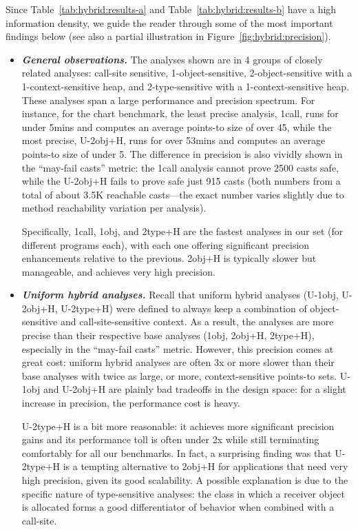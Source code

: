 \begin{table}
\label{tab:hybrid:results-b}
\end{table}

Since Table~\ref{tab:hybrid:results-a} and Table~\ref{tab:hybrid:results-b} have a high information density, we guide the reader through some of the most important findings below (see also a partial illustration in Figure~\ref{fig:hybrid:precision}).

\begin{itemize}
\item \textbf{\emph{General observations.}}
The analyses shown are in 4 groups of closely related analyses: call-site sensitive, 1-object-sensitive, 2-object-sensitive with a 1-context-sensitive heap, and 2-type-sensitive with a 1-context-sensitive heap. These analyses span a large performance and precision spectrum. For instance, for the chart benchmark, the least precise analysis, 1call, runs for under 5mins and computes an average points-to size of over 45, while the most precise, U-2obj+H, runs for over 53mins and computes an average points-to size of under 5. The difference in precision is also vividly shown in the ``may-fail casts'' metric: the 1call analysis cannot prove 2500 casts safe, while the U-2obj+H fails to prove safe just 915 casts (both numbers from a total of about 3.5K reachable casts---the exact number varies slightly due to method reachability variation per analysis). 

Specifically, 1call, 1obj, and 2type+H are the fastest analyses in our set (for different programs each), with each one offering significant precision enhancements relative to the previous. 2obj+H is typically slower but manageable, and achieves very high precision.

\item \textbf{\emph{Uniform hybrid analyses.}}
Recall that uniform hybrid analyses (U-1obj, U-2obj+H, U-2type+H) were defined to always keep a combination of object-sensitive and call-site-sensitive context. As a result, the analyses are more precise than their respective base analyses (1obj, 2obj+H, 2type+H), especially in the ``may-fail casts'' metric. However, this precision comes at great cost: uniform hybrid analyses are often 3x or more slower than their base analyses with twice as large, or more, context-sensitive points-to sets. U-1obj and U-2obj+H are plainly bad tradeoffs in the design space: for a slight increase in precision, the performance cost is heavy.

U-2type+H is a bit more reasonable: it achieves more significant precision gains and its performance toll is often under 2x while still terminating comfortably for all our benchmarks. In fact, a surprising finding was that U-2type+H is a tempting alternative to 2obj+H for applications that need very high precision, given its good scalability. A possible explanation is due to the specific nature of type-sensitive analyses: the class in which a receiver object is allocated forms a good differentiator of behavior when combined with a call-site.


\end{itemize}
